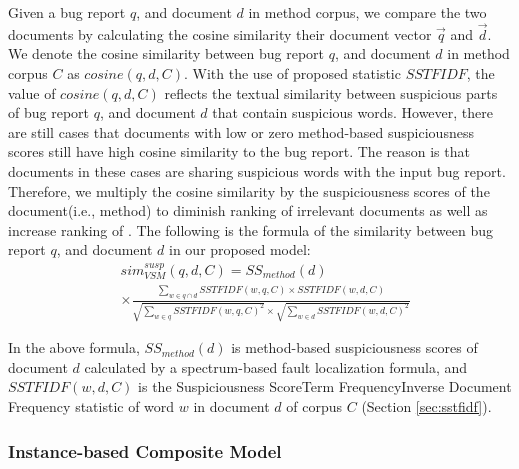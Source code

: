 Given a bug report $q$, and document $d$ in method corpus, we compare the two documents by calculating the cosine similarity their document vector $\vec{q}$ and $\vec{d}$. We denote the cosine similarity between bug report $q$, and document $d$ in method corpus $C$ as $cosine(q,d,C)$. With the use of proposed statistic $SSTFIDF$, the value of $cosine(q,d,C)$ reflects the textual similarity between suspicious parts of bug report $q$, and document $d$ that contain suspicious words. However, there are still cases that documents with low or zero method-based suspiciousness scores still have high cosine similarity to the bug report. The reason is that documents in these cases are sharing suspicious words with the input bug report. Therefore, we multiply the cosine similarity by the suspiciousness scores of the document(i.e., method) to diminish ranking of irrelevant documents as well as increase ranking of . The following is the formula of the similarity between bug report $q$, and document $d$ in our proposed model:
\begin{align}
&sim_{VSM}^{susp}(q,d,C)=SS_{method}(d)\nonumber \\
&\times \frac{\sum\limits_{w\in q \cap d} SSTFIDF(w,q,C)\times SSTFIDF(w,d,C)}{\sqrt{\sum\limits_{w \in q} SSTFIDF(w,q,C)^2} \times \sqrt{\sum\limits_{w \in d} SSTFIDF(w,d,C)^2}}
\label{eq:sum_vsm_susp}
\end{align}

In the above formula, $SS_{method}(d)$ is method-based suspiciousness scores of document $d$ calculated by a spectrum-based fault localization formula, and $SSTFIDF(w,d,C)$ is the Suspiciousness Score\textendash Term Frequency\textendash Inverse Document Frequency statistic of word $w$ in document $d$ of corpus $C$ (Section \ref{sec:sstfidf}).

\subsubsection{Instance-based Composite Model}\label{sec:composite_model}


